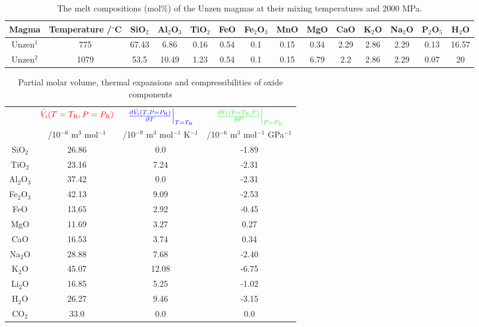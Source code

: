 \documentclass[]{book}
\theoremstyle{definition}
\begin{document}
\begin{enumerate}
  \begin{table}
    \small
    \centering
    \caption{The melt compositions (mol\%) of the Unzen magmas at their mixing temperatures and 2000 MPa. \label{tab:cold_comp}}
    \begin{tabular}{|c c|c c c c c c c c c c c c|}
      \hline
      Magma  & Temperature /$^{\circ}$C & SiO$_{2}$ & Al$_{2}$O$_{3}$ & TiO$_{2}$ & FeO & Fe$_{2}$O$_{3}$ & MnO & MgO & CaO & K$_{2}$O & Na$_{2}$O & P$_{2}$O$_{5}$ & H$_{2}$O \\
      \hline
      Unzen$^{1}$ & 775 & 67.43 & 6.86 & 0.16 & 0.54 & 0.1 & 0.15 & 0.34 & 2.29 & 2.86 & 2.29 & 0.13 & 16.57 \\
      Unzen$^{2}$ & 1079 & 53.5 & 10.49 & 1.23 & 0.54 & 0.1 & 0.15 & 6.79 & 2.2 & 2.86 & 2.29 & 0.07 & 20 \\
      \hline
    \end{tabular}
  \end{table}

  
  \begin{table}
    \centering
    \caption{Partial molar volume, thermal expansions and compressibilities of oxide components \label{tab:mol_vol}}
    \begin{tabular}{|c|c|c|c|}
      \hline
      & $\textcolor{red}{\bar{V_{i}}(T = T_{\text{R}}, P = P_{\text{R}})}$ & $\textcolor{blue}{\left.\frac{\partial \bar{V_{i}}(T, P = P_{\text{R}})}{\partial T}\right|_{T = T_{\text{R}}}}$ & $\textcolor{green}{\left.\frac{\partial \bar{V_{i}}(T = T_{\text{R}}, P)}{\partial P}\right|_{P = P_{R}}}$ \\
      & /10$^{-6}$ m$^{3}$ mol$^{-1}$ & /10$^{-9}$ m$^{3}$ mol$^{-1}$ K$^{-1}$ & /10$^{-6}$ m$^{3}$ mol$^{-1}$ GPa$^{-1}$ \\
      \hline
      SiO$_{2}$ & 26.86 & 0.0 & -1.89 \\
      TiO$_{2}$ & 23.16 & 7.24 & -2.31 \\
      Al$_{2}$O$_{3}$ & 37.42 & 0.0 & -2.31 \\
      Fe$_{2}$O$_{3}$ & 42.13 & 9.09 & -2.53 \\
      FeO & 13.65 & 2.92 & -0.45 \\
      MgO & 11.69 & 3.27 & 0.27 \\
      CaO & 16.53 & 3.74 & 0.34 \\
      Na$_{2}$O & 28.88 & 7.68 & -2.40 \\
      K$_{2}$O & 45.07 & 12.08 & -6.75 \\
      Li$_{2}$O & 16.85 & 5.25 & -1.02 \\
      H$_{2}$O & 26.27 & 9.46 & -3.15 \\
      CO$_{2}$ & 33.0 & 0.0 & 0.0 \\
      \hline  
    \end{tabular}
  \end{table}


\end{enumerate}
\end{document}
